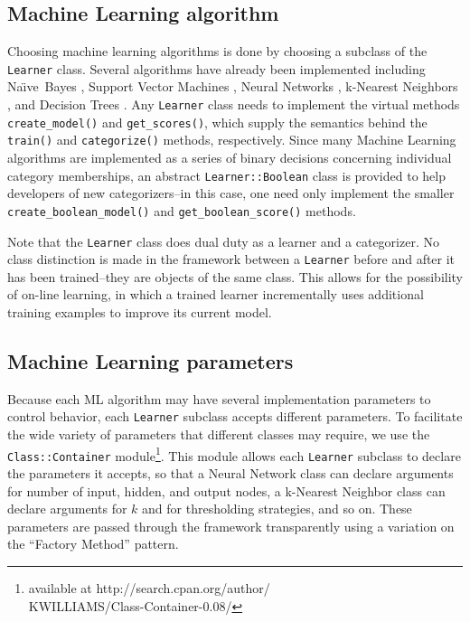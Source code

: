 \documentclass[twocolumn]{article}
\newcommand{\naive}{Na\"\i ve}
\begin{document}
\subsection*{Machine Learning algorithm}
Choosing machine learning algorithms is done
by choosing a subclass of the \texttt{Learner} class.  Several
algorithms have already been implemented including \naive\ Bayes
\cite{lewis:98}, Support Vector Machines \cite{scholkopf:99}
\cite{cortes:95}, Neural Networks \cite{calvo:01} \cite{yang:99},
k-Nearest Neighbors \cite{yang:99}, and Decision Trees
\cite{quinlan:89}.  Any \texttt{Learner} class needs to implement the
virtual methods \texttt{create\_model()} and \texttt{get\_scores()},
which supply the semantics behind the \texttt{train()} and
\texttt{categorize()} methods, respectively.  Since many Machine
Learning algorithms are implemented as a series of binary decisions
concerning individual category memberships, an abstract
\texttt{Learner::Boolean} class is provided to help developers of new
categorizers--in this case, one need only implement the smaller
\texttt{create\_boolean\_model()} and \texttt{get\_boolean\_score()}
methods.

Note that the \texttt{Learner} class does dual duty as a learner and a
categorizer.  No class distinction is made in the framework between a
\texttt{Learner} before and after it has been trained--they are
objects of the same class.  This allows for the possibility of on-line
learning, in which a trained learner incrementally uses additional
training examples to improve its current model.

\subsection*{Machine Learning parameters}
Because each ML algorithm may have several implementation parameters
to control behavior, each \texttt{Learner} subclass accepts different
parameters.  To facilitate the wide variety of parameters that
different classes may require, we use the \texttt{Class::Container}
module\footnote{available at http://search.cpan.org/author/\\
KWILLIAMS/Class-Container-0.08/}.  This module allows each
\texttt{Learner} subclass to declare the parameters it accepts, so
that a Neural Network class can declare arguments for number of input,
hidden, and output nodes, a k-Nearest Neighbor class can declare
arguments for $k$ and for thresholding strategies, and so on.  These
parameters are passed through the framework transparently using a
variation on the ``Factory Method'' pattern. \cite{gamma:95}
\end{document}
